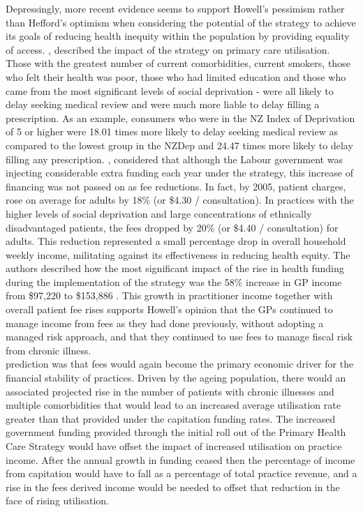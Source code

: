 \documentclass[11pt,a4paper]{article}
\begin{document}
Depressingly, more recent evidence seems to support Howell's pessimism rather than Hefford's optimism when considering the potential of the strategy to achieve its goals of reducing health inequity within the population by providing equality of access. \citet{jatrana2009primary}, described the impact of the strategy on primary care utilisation. Those with the greatest number of current comorbidities, current smokers, those who felt their health was poor, those who had limited education and those who came from the most significant levels of social deprivation - were all likely to delay seeking medical review and were much more liable to delay filling a prescription.  As an example, consumers who were in the NZ Index of Deprivation of 5 or higher were 18.01 times more likely to delay seeking medical review as compared to the lowest group in the NZDep and 24.47 times more likely to delay filling any prescription. \citet{cumming2008reforming}, considered  that although the Labour government was injecting considerable extra funding each year under the strategy, this increase of financing was not passed on as fee reductions.  In fact, by 2005, patient charges, rose on average for adults by 18\% (or \$4.30 / consultation). In practices with the higher levels of social deprivation and large concentrations of ethnically disadvantaged patients, the fees dropped by 20\% (or \$4.40 / consultation) for adults. This reduction represented a small percentage drop in overall household weekly income, militating against its effectiveness in reducing health equity.  The authors described how the most significant impact of the rise in health funding during the implementation of the strategy was the 58\% increase in GP income from \$97,220 to \$153,886 \citep{cumming2008reforming}. This growth in practitioner income together with overall patient fee rises supports Howell's opinion that the GPs continued to manage income from fees as they had done previously, without adopting a managed risk approach, and that they continued to use fees to manage fiscal risk from chronic illness. \\

\citet{howell2005restructuring} prediction was that fees would again become the primary economic driver for the financial stability of practices. Driven by the ageing  population, there would an associated projected rise in the number of patients with chronic illnesses and multiple comorbidities that would lead to an increased  average utilisation rate greater than that provided under the capitation funding rates. The increased government funding provided through the initial roll out of the Primary Health Care Strategy would have offset the impact of increased utilisation on practice income. After the annual growth in funding ceased then the percentage of income from capitation would have to fall as a percentage of total practice revenue, and a rise in the fees derived income would be needed to offset that reduction in the face of rising utilisation.\\
\end{document}
